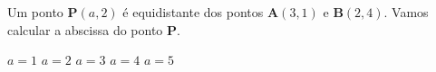 Um ponto $\mathbf{P}(a, 2)$ é equidistante dos pontos $\mathbf{A}(3, 1)$ e $\mathbf{B}(2, 4)$. Vamos calcular a abscissa do ponto $\mathbf{P}$.

$a=1$
$a=2$
$a=3$
$a=4$
$a=5$







